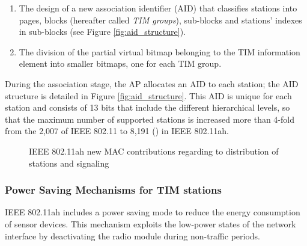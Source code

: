 \documentclass[]{article}
\begin{document}
\begin{enumerate}
\item The design of a new association identifier (AID) that classifies stations into pages, blocks (hereafter called \textit{TIM groups}), sub-blocks and stations' indexes in sub-blocks (see Figure  \ref{fig:aid_structure}).
\item The division of the partial virtual bitmap belonging to the TIM information element into smaller bitmaps, one for each TIM group.
\end{enumerate}

During the association stage, the AP allocates an AID to each station; the AID structure is detailed in Figure \ref{fig:aid_structure}. This AID is unique for each station and consists of 13 bits that include the different hierarchical levels, so that the maximum number of supported stations is increased more than 4-fold from the 2,007 of IEEE 802.11 to 8,191 () in IEEE 802.11ah. 


\setcounter{figure}{0}
\begin{figure}[p]
\begin{center}
\centering{}
\caption{IEEE 802.11ah new MAC contributions regarding to distribution of stations and signaling} \label{fig:Figure1}
\end{center}
\end{figure}

\subsubsection{Power Saving Mechanisms for TIM stations}
IEEE 802.11ah includes a power saving mode to reduce the energy consumption of sensor devices. This mechanism exploits the low-power states of the network interface by deactivating the radio module during non-traffic periods.
\end{document}
